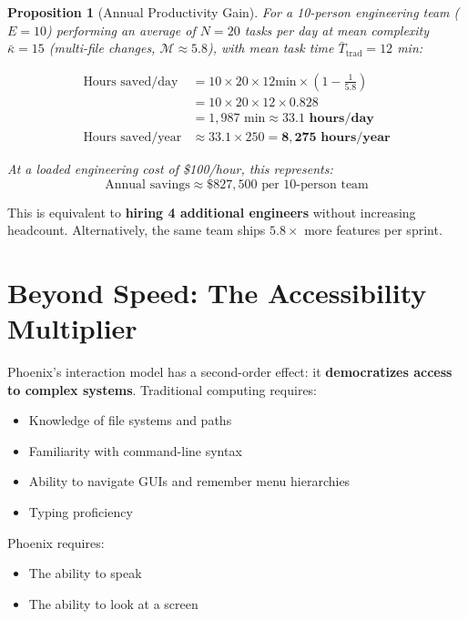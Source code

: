 \documentclass[11pt, a4paper]{article}
\newtheorem{proposition}{Proposition}
\begin{document}
\begin{proposition}[Annual Productivity Gain]
For a 10-person engineering team ($E = 10$) performing an average of $N = 20$
tasks per day at mean complexity $\bar{\kappa} = 15$ (multi-file changes,
$\mathcal{M} \approx 5.8$), with mean task time
$\bar{T}_{\text{trad}} = 12$ min:

\begin{align}
  \text{Hours saved/day} &= 10 \times 20 \times 12\text{min} \times \left(1 - \frac{1}{5.8}\right) \\
  &= 10 \times 20 \times 12 \times 0.828 \\
  &= 1{,}987 \text{ min} \approx \mathbf{33.1 \text{ hours/day}} \\[1em]
  \text{Hours saved/year} &\approx 33.1 \times 250 = \mathbf{8{,}275 \text{ hours/year}}
\end{align}

At a loaded engineering cost of \$100/hour, this represents:
\begin{equation}
  \text{Annual savings} \approx \$827{,}500 \text{ per 10-person team}
\end{equation}
\end{proposition}

This is equivalent to \textbf{hiring 4 additional engineers} without increasing
headcount. Alternatively, the same team ships $5.8\times$ more features per
sprint.

\section{Beyond Speed: The Accessibility Multiplier}

Phoenix's interaction model has a second-order effect: it \textbf{democratizes
access to complex systems}. Traditional computing requires:

\begin{itemize}[noitemsep]
  \item Knowledge of file systems and paths
  \item Familiarity with command-line syntax
  \item Ability to navigate GUIs and remember menu hierarchies
  \item Typing proficiency
\end{itemize}

Phoenix requires:
\begin{itemize}[noitemsep]
  \item The ability to speak
  \item The ability to look at a screen
\end{itemize}
\end{document}
